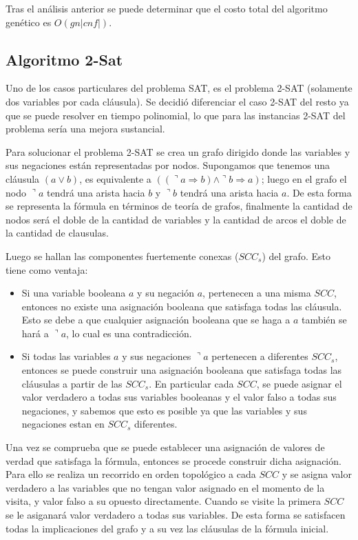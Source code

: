 \documentclass{article}
\begin{document}
            Tras el análisis anterior se puede determinar que el costo total del algoritmo genético es $O(gn|cnf|)$. 
    
    \subsection*{Algoritmo 2-Sat}
        
        Uno de los casos particulares del problema SAT, es el problema 2-SAT (solamente dos variables por cada cláusula).
        Se decidió diferenciar el caso 2-SAT del resto ya que se puede resolver en tiempo polinomial, lo que para 
        las instancias 2-SAT del problema sería una mejora sustancial.

        Para solucionar el problema 2-SAT se crea un grafo dirigido donde las variables y sus negaciones están representadas
        por nodos. Supongamos que tenemos una cláusula $(a \vee b)$, es equivalente a
        $((\urcorner a \Rightarrow b)\wedge \urcorner b \Rightarrow a)$;
        luego en el grafo el nodo $\urcorner a$ tendrá una arista hacia $b$ y $\urcorner b$ tendrá una arista hacia $a$. 
        De esta forma se representa la fórmula en términos de teoría de grafos, finalmente la cantidad de nodos será el doble 
        de la cantidad de variables y la cantidad de arcos el doble de la cantidad de clausulas.

        Luego se hallan las componentes fuertemente conexas ($SCC_s$) del grafo. Esto tiene como ventaja: 
        \begin{itemize}
            \item Si una variable booleana $a$ y su negación $a$, pertenecen a una misma $SCC$, 
            entonces no existe una asignación booleana que satisfaga todas las cláusula. Esto se debe a que cualquier 
            asignación booleana que se haga a $a$ también se hará a $\urcorner a$, lo cual es una contradicción.
            \item Si todas las variables $a$ y sus negaciones $\urcorner a$ pertenecen a diferentes $SCC_s$, entonces 
            se puede construir una asignación booleana que satisfaga todas las cláusulas a partir de las $SCC_s$. En particular
            cada $SCC$, se puede asignar el valor verdadero a todas sus variables booleanas y el valor falso a todas sus negaciones, 
            y sabemos que esto es posible ya que las variables y sus negaciones estan en $SCC_s$ diferentes.
        \end{itemize}

        Una vez se comprueba que se puede establecer una asignación de valores de verdad que satisfaga la fórmula, entonces se procede construir
        dicha asignación. Para ello se realiza un recorrido en orden topológico a cada $SCC$ y se asigna valor verdadero a las variables que no tengan
        valor asignado en el momento de la visita, y valor falso a su opuesto directamente. Cuando se visite la primera $SCC$ se le asiganará 
        valor verdadero a todas sus variables. De esta forma se satisfacen todas la implicaciones del grafo y a su vez las cláusulas de la fórmula
        inicial.
\end{document}
